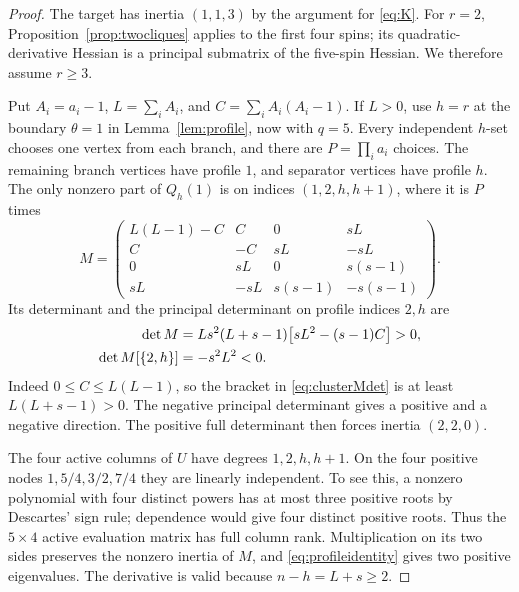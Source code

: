 \documentclass[11pt]{article}
\theoremstyle{remark}
\begin{document}
\begin{proof}
The target has inertia $(1,1,3)$ by the argument for
\eqref{eq:K}. For $r=2$, Proposition~\ref{prop:twocliques}
applies to the first four spins; its quadratic-derivative Hessian
is a principal submatrix of the five-spin Hessian.
We therefore assume $r\geq3$.

Put $A_i=a_i-1$, $L=\sum_i A_i$, and
$C=\sum_i A_i(A_i-1)$. If $L>0$, use $h=r$ at the boundary
$\theta=1$ in Lemma~\ref{lem:profile}, now with $q=5$.
Every independent $h$-set chooses one vertex from each branch,
and there are $P=\prod_i a_i$ choices. The remaining branch
vertices have profile $1$, and separator vertices have profile $h$.
The only nonzero part of $Q_h(1)$ is on indices $(1,2,h,h+1)$,
where it is $P$ times
\begin{equation}
 M=\begin{pmatrix}
 L(L-1)-C&C&0&sL\\
 C&-C&sL&-sL\\
 0&sL&0&s(s-1)\\
 sL&-sL&s(s-1)&-s(s-1)
 \end{pmatrix}.                                     \label{eq:clusterM}
\end{equation}
Its determinant and the principal determinant on profile indices
$2,h$ are
\begin{align}
 \det M&=Ls^2(L+s-1)\bigl[sL^2-(s-1)C\bigr]>0,
                                                      \label{eq:clusterMdet}\\
 \det M[\{2,h\}]&=-s^2L^2<0.\notag
\end{align}
Indeed $0\leq C\leq L(L-1)$, so the bracket in
\eqref{eq:clusterMdet} is at least $L(L+s-1)>0$.
The negative principal determinant gives a positive and a negative
direction. The positive full determinant then forces inertia
$(2,2,0)$.

The four active columns of $U$ have degrees $1,2,h,h+1$.
On the four positive nodes $1,5/4,3/2,7/4$ they are linearly
independent. To see this, a nonzero polynomial with four distinct
powers has at most three positive roots by Descartes' sign rule;
dependence would give four distinct positive roots. Thus the
$5\times4$ active evaluation matrix has full column rank.
Multiplication on its two sides preserves the nonzero inertia of
$M$, and \eqref{eq:profileidentity} gives two positive eigenvalues.
The derivative is valid because $n-h=L+s\geq2$.


\end{proof}
\end{document}
